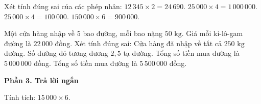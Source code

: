 \begin{ex} %
Xét tính đúng sai của các phép nhân:
\choiceTF
{\True $12\,345 \times 2 = 24\,690$.}
{$25\,000 \times 4 = 1\,000\,000$.}
{\True $25\,000 \times 4 = 100\,000$.}
{\True $150\,000 \times 6 = 900\,000$.}
\end{ex}

\begin{ex} %
Một cửa hàng nhập về 5 bao đường, mỗi bao nặng $50\text{ kg}$. Giá mỗi ki-lô-gam đường là $22\,000$ đồng. Xét tính đúng sai:
\choiceTF
{\True Cửa hàng đã nhập về tất cả $250\text{ kg}$ đường.}
{\True Số đường đó tương đương $2{,}5$ tạ đường.}
{Tổng số tiền mua đường là $5\,000\,000$ đồng.}
{\True Tổng số tiền mua đường là $5\,500\,000$ đồng.}
\end{ex}

\textbf{Phần 3. Trả lời ngắn}

\begin{ex} %
Tính tích: $15\,000 \times 6$.
\end{ex}

